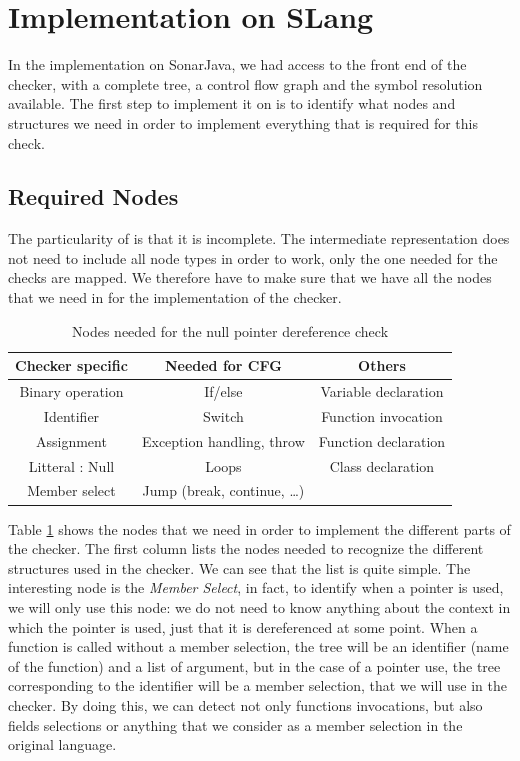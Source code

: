 \section{Implementation on SLang}
\label{sec:implementation_slang}

In the implementation on SonarJava, we had access to the front end of the checker, with a complete tree, a control flow graph and the symbol resolution available.
The first step to implement it on \slang{} is to identify what nodes and structures we need in order to implement everything that is required for this check.

\subsection{Required Nodes}
\label{subsec:nodes}

The particularity of \slang{}  is that it is incomplete. 
The intermediate representation does not need to include all node types in order to work, only the one needed for the checks are mapped. 
We therefore have to make sure that we have all the nodes that we need in \slang{} for the implementation of the checker.

\begin{table}[h]
	\caption{Nodes needed for the null pointer dereference check}
	\label{table:nodes-needed}
	\begin{tabular}{|c|c|c|}
		\hline
		\bf Checker specific & \bf Needed for CFG & \bf Others  \\ \hline
	    Binary operation & If/else & Variable declaration \\
		Identifier & Switch & Function invocation \\
		Assignment & Exception handling, throw  & Function declaration \\
		Litteral : Null & Loops & Class declaration \\
		Member select & Jump (break, continue, …) & \\ \hline
	\end{tabular}
\end{table}

Table \ref{table:nodes-needed} shows the nodes that we need in order to implement the different parts of the checker.
The first column lists the nodes needed to recognize the different structures used in the checker. 
We can see that the list is quite simple. 
The interesting node is the \emph{Member Select}, in fact, to identify when a pointer is used, we will only use this node: we do not need to know anything about the context in which the pointer is used, just that it is dereferenced at some point.
When a function is called without a member selection, the tree will be an identifier (name of the function) and a list of argument, but in the case of a pointer use, the tree corresponding to the identifier will be a member selection, that we will use in the checker.
By doing this, we can detect not only functions invocations, but also fields selections or anything that we consider as a member selection in the original language.

